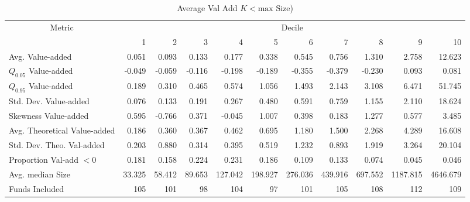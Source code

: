 \documentclass[12pt]{article}
\begin{document}
\begin{landscape}
    \begin{table}
        \centering
        \begin{threeparttable}
            \caption{Average Val Add $K < \text{max}$ Size)}
            \label{tab:value-added-size-lt-max-full}
            \begin{tabular}{lrrrrrrrrrr}
                \toprule
                \multicolumn{1}{c}{Metric} & \multicolumn{10}{c}{Decile} \\
                \cmidrule(lr){2-11}
                \multicolumn{1}{c}{} & 1 & 2 & 3 & 4 & 5 & 6 & 7 & 8 & 9 & 10 \\
                \midrule
                Avg. Value-added & 0.051 & 0.093 & 0.133 & 0.177 & 0.338 & 0.545 & 0.756 & 1.310 & 2.758 & 12.623 \\
                $Q_{0.05}$ Value-added & -0.049 & -0.059 & -0.116 & -0.198 & -0.189 & -0.355 & -0.379 & -0.230 & 0.093 & 0.081 \\
                $Q_{0.95}$ Value-added & 0.189 & 0.310 & 0.465 & 0.574 & 1.056 & 1.493 & 2.143 & 3.108 & 6.471 & 51.745 \\
                Std. Dev. Value-added & 0.076 & 0.133 & 0.191 & 0.267 & 0.480 & 0.591 & 0.759 & 1.155 & 2.110 & 18.624 \\
                Skewness Value-added & 0.595 & -0.766 & 0.371 & -0.045 & 1.007 & 0.398 & 0.183 & 1.277 & 0.577 & 3.485 \\
                \midrule
                Avg. Theoretical Value-added & 0.186 & 0.360 & 0.367 & 0.462 & 0.695 & 1.180 & 1.500 & 2.268 & 4.289 & 16.608 \\
                Std. Dev. Theo. Val-added & 0.203 & 0.880 & 0.314 & 0.395 & 0.519 & 1.232 & 0.893 & 1.919 & 3.264 & 20.104 \\
                \midrule
                Proportion Val-add $<0$ & 0.181 & 0.158 & 0.224 & 0.231 & 0.186 & 0.109 & 0.133 & 0.074 & 0.045 & 0.046 \\
                \midrule
                Avg. median Size & 33.325 & 58.412 & 89.653 & 127.042 & 198.927 & 276.036 & 439.916 & 697.552 & 1187.815 & 4646.679 \\
                \midrule
                Funds Included & 105 & 101 & 98 & 104 & 97 & 101 & 105 & 108 & 112 & 109 \\
                \bottomrule
            \end{tabular}
        \end{threeparttable}
    \end{table}
\end{landscape}
\end{document}
